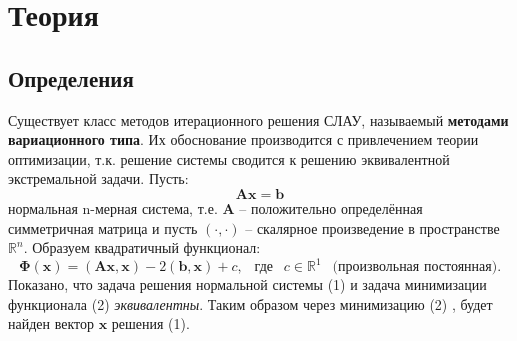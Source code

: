 


\clearpage
{}
\setcounter{page}{2}
\tableofcontents

\clearpage
\section{Теория}
\subsection{Определения}

Существует класс методов итерационного решения СЛАУ, называемый {\bf методами вариационного типа}. Их обоснование производится с привлечением теории оптимизации, т.к. решение системы сводится к решению эквивалентной экстремальной задачи. Пусть:
\begin{equation}
    \mathbf{Ax=b}
\end{equation}
нормальная n-мерная система, т.е. $\mathbf{A}$ -- положительно определённая симметричная матрица и пусть $(\cdot, \cdot)$ -- скалярное произведение в пространстве $\mathbb{R}^n$. Образуем квадратичный функционал:
\begin{equation}
    \mathbf{\Phi}(\mathbf{x})=(\mathbf{Ax}, \mathbf{x}) - 2(\mathbf{b}, \mathbf{x}) + c,
    ~~\text{ где }~~ c \in \mathbb{R}^1 ~~\text{ (произвольная постоянная)}.
\end{equation}
Показано, что задача решения нормальной системы (1) и задача минимизации функционала (2) {\it эквивалентны}. Таким образом через минимизацию (2) , будет найден вектор $\mathbf{x}$ решения (1).

